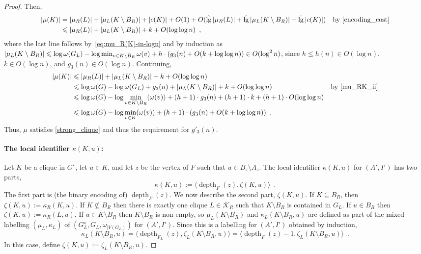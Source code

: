 \documentclass[twoside,leqno]{article}
\let\eqref\cref
\renewcommand{\le}{\leqslant}
\renewcommand{\leq}{\leqslant}
\DeclareMathOperator{\depth}{depth}
\DeclareMathOperator{\lgg}{\hat{lg}}
\newcommand{\Oh}{O}
\begin{document}
\begin{proof}
  Then,
  \begin{align*}
    |\mu(K)|
     & = |\mu_R(L)| + |\mu_{L}(K\setminus B_R)| + |c(K)| + \Oh(1)+\Oh(\lgg|\mu_R(L)|+\lgg|\mu_L(K\setminus B_R)|+\lgg|c(K)|)
     & \text{by \eqref{encoding_cost}}                                                                                       \\
     & \le |\mu_R(L)| + |\mu_{L}(K\setminus B_R)| + k + \Oh(\log\log n)\enspace,
  \end{align*}
  where the last line follows by~\eqref{eq:mu_R(K)-in-logn} and by induction as $|\mu_L(K\setminus B_R)|\leq \log\omega(G_L)-\linebreak \log\min_{v\in K\setminus B_R}\omega(v) + h\cdot(g_3(n)+\Oh(k+\log\log n)) \in\Oh(\log^2 n)$, since $h\le h(n)\in\Oh(\log n)$, $k\in\Oh(\log n)$, and $g_3(n)\in\Oh(\log n)$. Continuing,
  \begin{align*}
    |\mu(K)|
     & \le |\mu_R(L)| + |\mu_{L}(K\setminus B_R)| + k + \Oh(\log\log n)                                                             \\
     & \le \log\omega(G)-\log \omega(G_{L}) + g_3(n) + |\mu_{L}(K\setminus B_R)| + k + \Oh(\log\log n)
     & \text{by~\eqref{mu_RK_ii}}                                                                                                   \\
     & \le \log\omega(G) - \log\min_{v\in K\setminus B_R}(\omega(v)) + (h+1)\cdot g_3(n) + (h+1)\cdot k + (h+1)\cdot\Oh(\log\log n) \\
     & \le \log\omega(G) - \log\min_{v\in K}(\omega(v)) + (h+1)\cdot (g_3(n) + \Oh(k+\log\log n)) \enspace .
  \end{align*}
  Thus, $\mu$ satisfies \eqref{strong_clique} and thus the requirement for $g'_3(n)$.

  \paragraph{The local identifier $\kappa(K,u)$:}
  Let $K$ be a clique in $G^\star$, let $u\in K$, and let $z$ be the vertex of $F$ such that $u\in B_z\setminus A_z$.   The local identifier $\kappa(K,u)$ for $(A',I')$ has two parts,
  \[
    \kappa(K,u) := \langle\depth_F(z),\zeta(K,u)\rangle \enspace .
  \]
  The first part is (the binary encoding of) $\depth_F(z)$. We now describe the second part, $\zeta(K,u)$.  If $K\subseteq B_R$, then $\zeta(K,u):=\kappa_R(K,u)$.
  If $K\not\subseteq B_R$ then there is exactly one clique $L\in\mathcal{K}_R$ such that $K\setminus B_R$ is contained in $G_L$.  If $u\in B_R$ then $\zeta(K,u):=\kappa_R(L,u)$.  If $u\in K\setminus B_R$ then $K\setminus B_R$ is non-empty, so $\mu_L(K\setminus B_R)$ and  $\kappa_L(K\setminus B_R, u)$ are defined as part of the mixed labelling $(\mu_L,\kappa_L)$ of $(G^\star_L,G_L,\omega_{|V(G_L)})$ for $(A',I')$.
  Since this is a labelling for $(A',I')$ obtained by induction,
  \begin{equation}
    \kappa_L(K\setminus B_R,u)=\langle\depth_{F_L}(z),\zeta_{L}(K\setminus B_R,u)\rangle=\langle\depth_F(z)-1,\zeta_L(K\setminus B_R,u)\rangle\enspace.
    \label{off_by_one}
  \end{equation}
  In this case, define $\zeta(K,u):=\zeta_L(K\setminus B_R,u)$.


\end{proof}
\end{document}
